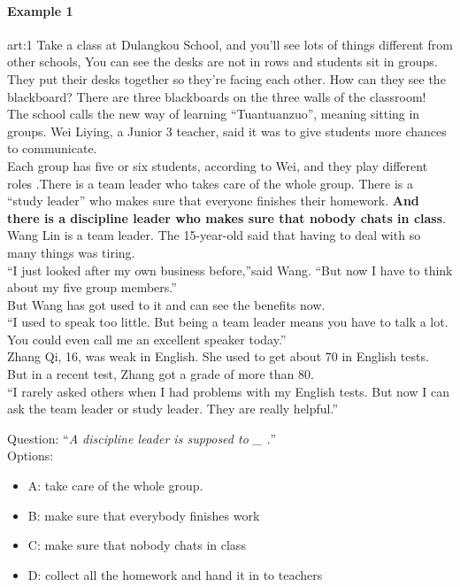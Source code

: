 \paragraph{Example 1}
\begin{passage}{art:1}
Take a class at Dulangkou School, and you'll see lots of things different from other schools, You can see the desks are not in rows and students sit in groups. They put their desks together so they're facing each other. How can they see the blackboard? There are three blackboards on the three walls of the classroom! \\
The school calls the new way of learning ``Tuantuanzuo'', meaning sitting in groups. Wei Liying, a Junior 3 teacher, said it was to give students more chances to communicate. \\
Each group has five or six students, according to Wei, and they play different roles .There is a team leader who takes care of the whole group. There is a ``study leader'' who makes sure that everyone finishes their homework. \textbf{And there is a discipline leader who makes sure that nobody chats in class}. \\
Wang Lin is a team leader. The 15-year-old said that having to deal with so many things was tiring. \\
``I just looked after my own business before,''said Wang. ``But now I have to think about my five group members.'' \\
But Wang has got used to it and can see the benefits now. \\
``I used to speak too little. But being a team leader means you have to talk a lot. You could even call me an excellent speaker today.'' \\
Zhang Qi, 16, was weak in English. She used to get about 70 in English tests. But in a recent test, Zhang got a grade of more than 80.\\
``I rarely  asked others when I had problems with my English tests. But now I can ask the team leader or study leader. They are really helpful.''
\end{passage}
Question: ``\emph{A discipline leader is supposed to  \_  .}''\\
Options: 
\begin{itemize}
 \item A: take care of the whole group.
 \item B: make sure that everybody finishes work
 \item C: make sure that nobody chats in class
 \item D: collect all the homework and hand it in to teachers
\end{itemize}

